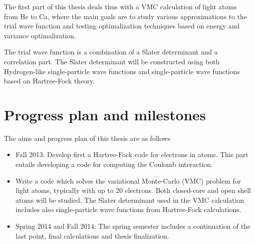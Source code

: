 The first part of this thesis deals thus with a VMC calculation of light atoms
from He to Ca, where the main goals are to study various approximations
to the trial wave function  and testing optimalization techniques based 
on energy and variance optimalization.

The trial wave function is a combination of a Slater determinant 
and a correlation part. The Slater determinant will be constructed
using both Hydrogen-like single-particle wave functions and single-particle
wave functions based on Hartree-Fock theory.

\section*{Progress plan and milestones}
The aims and progress plan of this thesis are as follows
\begin{itemize}
\item Fall 2013: Develop first a Hartree-Fock code for electrons in atoms.  
This part entails developing a code for computing the Coulomb interaction.
\item Write a code which solves the variational Monte-Carlo (VMC) problem
      for light atoms, typically with up to 20 electrons.  Both closed-core and open shell
atoms will be studied. 
      The Slater determinant used in the VMC calculation includes also
      single-particle wave functions from Hartree-Fock calculations.
 \item Spring 2014 and Fall 2014: The spring semester includes a continuation of the last point, final calculations and thesis finalization.

\end{itemize}
 



